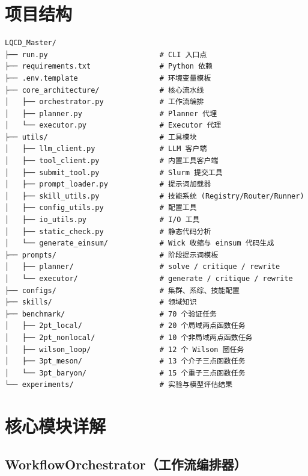 \documentclass[12pt,a4paper]{ctexart}
\begin{document}
\section{项目结构}

\begin{lstlisting}[style=bashcode]
LQCD_Master/
├── run.py                          # CLI 入口点
├── requirements.txt                # Python 依赖
├── .env.template                   # 环境变量模板
├── core_architecture/              # 核心流水线
│   ├── orchestrator.py             # 工作流编排
│   ├── planner.py                  # Planner 代理
│   └── executor.py                 # Executor 代理
├── utils/                          # 工具模块
│   ├── llm_client.py               # LLM 客户端
│   ├── tool_client.py              # 内置工具客户端
│   ├── submit_tool.py              # Slurm 提交工具
│   ├── prompt_loader.py            # 提示词加载器
│   ├── skill_utils.py              # 技能系统 (Registry/Router/Runner)
│   ├── config_utils.py             # 配置工具
│   ├── io_utils.py                 # I/O 工具
│   ├── static_check.py             # 静态代码分析
│   └── generate_einsum/            # Wick 收缩与 einsum 代码生成
├── prompts/                        # 阶段提示词模板
│   ├── planner/                    # solve / critique / rewrite
│   └── executor/                   # generate / critique / rewrite
├── configs/                        # 集群、系综、技能配置
├── skills/                         # 领域知识
├── benchmark/                      # 70 个验证任务
│   ├── 2pt_local/                  # 20 个局域两点函数任务
│   ├── 2pt_nonlocal/               # 10 个非局域两点函数任务
│   ├── wilson_loop/                # 12 个 Wilson 圈任务
│   ├── 3pt_meson/                  # 13 个介子三点函数任务
│   └── 3pt_baryon/                 # 15 个重子三点函数任务
└── experiments/                    # 实验与模型评估结果
\end{lstlisting}

\section{核心模块详解}

\subsection{WorkflowOrchestrator（工作流编排器）}
\end{document}
